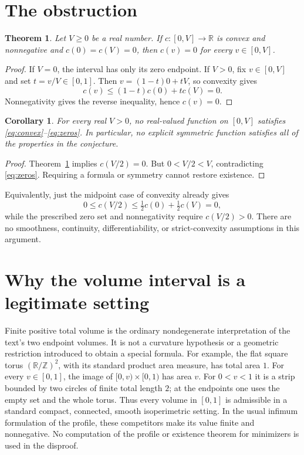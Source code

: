 \documentclass[11pt]{article}
\newtheorem{theorem}{Theorem}
\newtheorem{corollary}{Corollary}
\begin{document}
\section{The obstruction}
\begin{theorem}\label{thm:zero}
Let $V\geq 0$ be a real number. If $c:[0,V]\to\mathbb R$ is convex and
nonnegative and $c(0)=c(V)=0$, then $c(v)=0$ for every $v\in[0,V]$.
\end{theorem}
\begin{proof}
If $V=0$, the interval has only its zero endpoint. If $V>0$, fix $v\in[0,V]$
and set $t=v/V\in[0,1]$. Then $v=(1-t)0+tV$, so convexity gives
\[
 c(v)\leq(1-t)c(0)+tc(V)=0.
\]
Nonnegativity gives the reverse inequality, hence $c(v)=0$.
\end{proof}

\begin{corollary}\label{cor:no}
For every real $V>0$, no real-valued function on $[0,V]$ satisfies
\eqref{eq:convex}--\eqref{eq:zeros}. In particular, no explicit symmetric
function satisfies all of the properties in the conjecture.
\end{corollary}
\begin{proof}
Theorem~\ref{thm:zero} implies $c(V/2)=0$. But $0<V/2<V$, contradicting
\eqref{eq:zeros}. Requiring a formula or symmetry cannot restore existence.
\end{proof}

Equivalently, just the midpoint case of convexity already gives
\[
 0\leq c(V/2)\leq \tfrac12c(0)+\tfrac12c(V)=0,
\]
while the prescribed zero set and nonnegativity require $c(V/2)>0$.
There are no smoothness, continuity, differentiability, or strict-convexity
assumptions in this argument.

\section{Why the volume interval is a legitimate setting}
Finite positive total volume is the ordinary nondegenerate interpretation of
the text's two endpoint volumes. It is not a curvature hypothesis or a
geometric restriction introduced to obtain a special formula. For example,
the flat square torus $(\mathbb R/\mathbb Z)^2$, with its standard product
area measure, has total area $1$. For every $v\in[0,1]$, the image of
$[0,v)\times[0,1)$ has area $v$. For $0<v<1$ it is a strip bounded by two
circles of finite total length $2$; at the endpoints one uses the empty set
and the whole torus. Thus every volume in $[0,1]$ is admissible in a standard
compact, connected, smooth isoperimetric setting. In the usual infimum
formulation of the profile, these competitors make its value finite and
nonnegative. No computation of the profile or existence theorem for
minimizers is used in the disproof.
\end{document}
